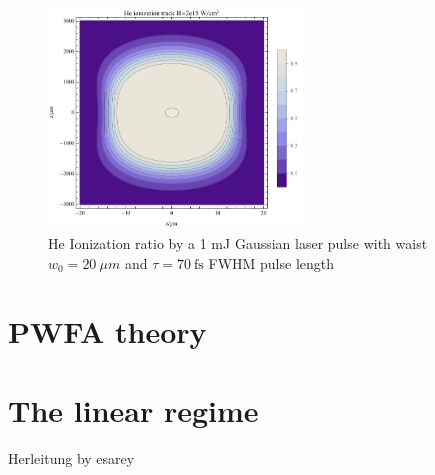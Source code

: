 \begin{figure}
\centering
\includegraphics[width=0.6\textwidth]{theory/images/raw/Ionization_Torch_contourplot.pdf}
\caption{He Ionization ratio by a 1 mJ Gaussian laser pulse with waist $w_0=20\ \mu m$ and $\tau = 70\ \mathrm{fs}$ FWHM pulse length}
\label{img:Torch_contourplot}
\end{figure}



\section{PWFA theory}
\section{The linear regime}
Herleitung by esarey \cite{RevModPhys.81.1229}


